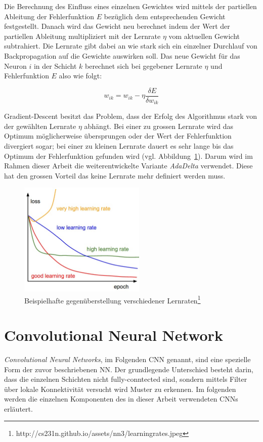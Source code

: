 Die Berechnung des Einfluss eines einzelnen Gewichtes wird mittels der partiellen Ableitung der Fehlerfunktion $E$ bezüglich dem entsprechenden Gewicht festgestellt. Danach wird das Gewicht neu berechnet indem der Wert der partiellen Ableitung multipliziert mit der Lernrate $\eta$ vom aktuellen Gewicht subtrahiert. Die Lernrate gibt dabei an wie stark sich ein einzelner Durchlauf von Backpropagation auf die Gewichte auswirken soll. Das neue Gewicht für das Neuron $i$ in der Schicht $k$ berechnet sich bei gegebener Lernrate $\eta$ und Fehlerfunktion $E$ also wie folgt:

\begin{equation}
w_{ik} = w_{ik} - \eta \frac{\delta E}{\delta w_{ik}}
\end{equation}

Gradient-Descent besitzt das Problem, dass der Erfolg des Algorithmus stark von der gewählten Lernrate $\eta$ abhängt. Bei einer zu grossen Lernrate wird das Optimum möglicherweise übersprungen oder der Wert der Fehlerfunktion divergiert sogar; bei einer zu kleinen Lernrate dauert es sehr lange bis das Optimum der Fehlerfunktion gefunden wird (vgl. Abbildung~\ref{fig:learn_rates}). Darum wird im Rahmen dieser Arbeit die weiterentwickelte Variante \emph{AdaDelta} \cite{zeiler2012adadelta} verwendet. Diese hat den grossen Vorteil das keine Lernrate mehr definiert werden muss.

\begin{figure}[h]
  \centering
  \includegraphics[width=6cm]{img/learning_rates_comparison}
  \caption{Beispielhafte gegenüberstellung verschiedener Lernraten\protect\footnote{http://cs231n.github.io/assets/nn3/learningrates.jpeg}}
  \label{fig:learn_rates}
\end{figure}

\section{Convolutional Neural Network}
\emph{Convolutional Neural Networks}, im Folgenden \gls{CNN} genannt, sind eine spezielle Form der zuvor beschriebenen NN. Der grundlegende Unterschied besteht darin, dass die einzelnen Schichten nicht fully-conntected sind, sondern mittels Filter über lokale Konnektivität versucht wird Muster zu erkennen. Im folgenden werden die einzelnen Komponenten des in dieser Arbeit verwendeten CNNs erläutert.

